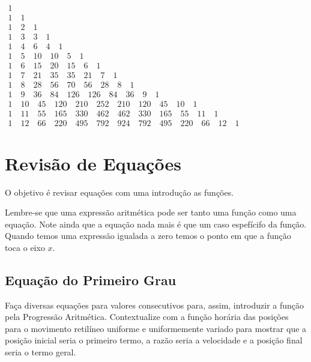  \begin{center}
$\begin{matrix} 1 \\ 1 \quad 1 \\ 1 \quad 2 \quad 1 \\ 1 \quad 3 \quad 3 \quad 1 \\ 1 \quad 4 \quad 6 \quad 4 \quad 1 \\ 1 \quad 5 \quad 10 \quad 10 \quad 5 \quad 1 \\ 1 \quad 6 \quad 15 \quad 20 \quad 15 \quad 6 \quad 1 \\ 1 \quad 7 \quad 21 \quad 35 \quad 35 \quad 21 \quad 7 \quad 1 \\ 1 \quad 8 \quad 28 \quad 56 \quad 70 \quad 56 \quad 28 \quad 8 \quad 1 \\ 1 \quad 9 \quad 36 \quad 84 \quad 126 \quad 126 \quad 84 \quad 36 \quad 9 \quad 1 \\ 1 \quad 10 \quad 45 \quad 120 \quad 210 \quad 252 \quad 210 \quad 120 \quad 45 \quad 10 \quad 1 \\ 1 \quad 11 \quad 55 \quad 165 \quad 330 \quad 462 \quad 462 \quad 330 \quad 165 \quad 55 \quad 11 \quad 1 \\ 1 \quad 12 \quad 66 \quad 220 \quad 495 \quad 792 \quad 924 \quad 792 \quad 495 \quad 220 \quad 66 \quad 12 \quad 1 \end{matrix}$
\end{center}

\section{Revisão de Equações}
O objetivo é revisar equações com uma introdução as funções. 

Lembre-se que uma expressão aritmética pode ser tanto uma função como uma equação. Note ainda que a equação nada mais é que um caso espefícifo da função. Quando temos uma expressão igualada a zero temos o ponto em que a função toca o eixo $x$.

\subsection{Equação do Primeiro Grau}
Faça diversas equações para valores consecutivos para, assim, introduzir a função pela \linebreak Progressão Aritmética. Contextualize com a função horária das posições para o movimento retilíneo uniforme e uniformemente variado para mostrar que a posição inicial seria o primeiro termo, a razão seria a velocidade e a posição final seria o termo geral.

